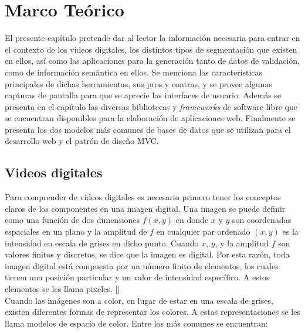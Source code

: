 \chapter{Marco Teórico}

El presente capítulo pretende dar al lector la información necesaria para entrar en el contexto de los videos digitales, los distintos tipos de segmentación que existen en ellos, así como las aplicaciones para la generación tanto de datos de validación, como de información semántica en ellos. Se menciona las características principales de dichas herramientas, sus pros y contras, y se provee algunas capturas de pantalla para que se aprecie las interfaces de usuario. Además se presenta en el capítulo las diversas bibliotecas y \textit{frameworks} de software libre que se encuentran disponibles para la elaboración de aplicaciones web. Finalmente se presenta los dos modelos más comunes de bases de datos que se utilizan para el desarrollo web y el patrón de diseño MVC.

\section{Videos digitales}

Para comprender de videos digitales es necesario primero tener los conceptos claros de los componentes en una imagen digital. Una imagen se puede definir como una función de dos dimensiones $f(x,y)$ en donde $x$ y $y$ son coordenadas espaciales en un plano y la amplitud de $f$ en cualquier par ordenado $(x,y)$ es la intensidad en escala de grises en dicho punto. Cuando $x$, $y$, y la amplitud $f$ son valores finitos y discretos, se dice que la imagen es digital. Por esta razón, toda imagen digital está compuesta por un número finito de elementos, los cuales tienen una posición particular y un valor de intensidad específico. A estos elementos se les llama pixeles. [\cite{digitalImage}]\\

Cuando las imágenes son a color, en lugar de estar en una escala de grises, existen diferentes formas de representar los colores. A estas representaciones se les llama modelos de espacio de color. Entre los más comunes se encuentran:

